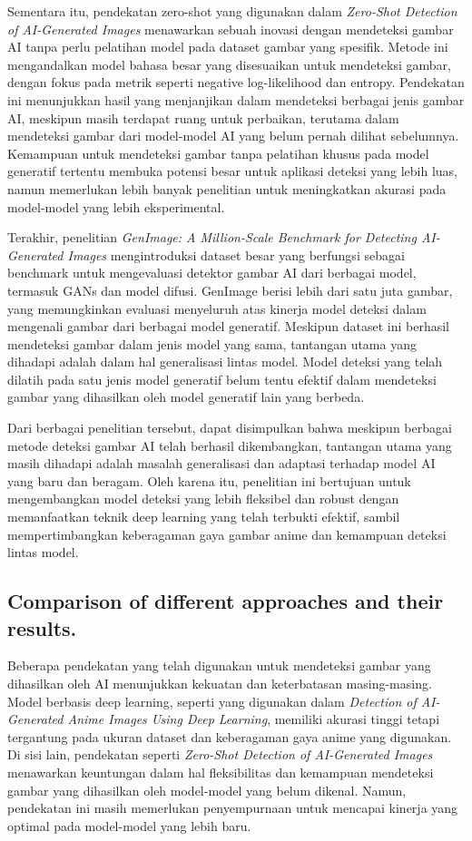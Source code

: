 \documentclass[12pt,a4paper]{article}
\begin{document}
Sementara itu, pendekatan zero-shot yang digunakan dalam \textit{Zero-Shot Detection of AI-Generated Images} menawarkan sebuah inovasi dengan mendeteksi gambar AI tanpa perlu pelatihan model pada dataset gambar yang spesifik. Metode ini mengandalkan model bahasa besar yang disesuaikan untuk mendeteksi gambar, dengan fokus pada metrik seperti negative log-likelihood dan entropy. Pendekatan ini menunjukkan hasil yang menjanjikan dalam mendeteksi berbagai jenis gambar AI, meskipun masih terdapat ruang untuk perbaikan, terutama dalam mendeteksi gambar dari model-model AI yang belum pernah dilihat sebelumnya. Kemampuan untuk mendeteksi gambar tanpa pelatihan khusus pada model generatif tertentu membuka potensi besar untuk aplikasi deteksi yang lebih luas, namun memerlukan lebih banyak penelitian untuk meningkatkan akurasi pada model-model yang lebih eksperimental.

Terakhir, penelitian \textit{GenImage: A Million-Scale Benchmark for Detecting AI-Generated Images} mengintroduksi dataset besar yang berfungsi sebagai benchmark untuk mengevaluasi detektor gambar AI dari berbagai model, termasuk GANs dan model difusi. GenImage berisi lebih dari satu juta gambar, yang memungkinkan evaluasi menyeluruh atas kinerja model deteksi dalam mengenali gambar dari berbagai model generatif. Meskipun dataset ini berhasil mendeteksi gambar dalam jenis model yang sama, tantangan utama yang dihadapi adalah dalam hal generalisasi lintas model. Model deteksi yang telah dilatih pada satu jenis model generatif belum tentu efektif dalam mendeteksi gambar yang dihasilkan oleh model generatif lain yang berbeda.

Dari berbagai penelitian tersebut, dapat disimpulkan bahwa meskipun berbagai metode deteksi gambar AI telah berhasil dikembangkan, tantangan utama yang masih dihadapi adalah masalah generalisasi dan adaptasi terhadap model AI yang baru dan beragam. Oleh karena itu, penelitian ini bertujuan untuk mengembangkan model deteksi yang lebih fleksibel dan robust dengan memanfaatkan teknik deep learning yang telah terbukti efektif, sambil mempertimbangkan keberagaman gaya gambar anime dan kemampuan deteksi lintas model.


 \subsection{Comparison of different approaches and their results.}Beberapa pendekatan yang telah digunakan untuk mendeteksi gambar yang dihasilkan oleh AI menunjukkan kekuatan dan keterbatasan masing-masing. Model berbasis deep learning, seperti yang digunakan dalam \textit{Detection of AI-Generated Anime Images Using Deep Learning}, memiliki akurasi tinggi tetapi tergantung pada ukuran dataset dan keberagaman gaya anime yang digunakan. Di sisi lain, pendekatan seperti \textit{Zero-Shot Detection of AI-Generated Images} menawarkan keuntungan dalam hal fleksibilitas dan kemampuan mendeteksi gambar yang dihasilkan oleh model-model yang belum dikenal. Namun, pendekatan ini masih memerlukan penyempurnaan untuk mencapai kinerja yang optimal pada model-model yang lebih baru.
\end{document}
